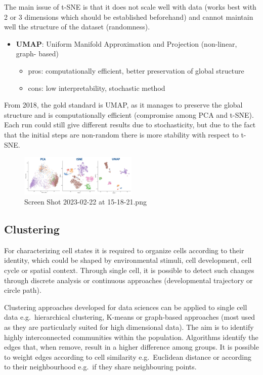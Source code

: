 The main issue of t-SNE is that it does not scale well with data (works
best with 2 or 3 dimensions which should be established beforehand) and
cannot maintain well the structure of the dataset (randomness).

\begin{itemize}
\tightlist
\item
  \textbf{UMAP}: Uniform Manifold Approximation and Projection
  (non-linear, graph- based)

  \begin{itemize}
  \tightlist
  \item
    pros: computationally efficient, better preservation of global
    structure
  \item
    cons: low interpretability, stochastic method
  \end{itemize}
\end{itemize}

From 2018, the gold standard is UMAP, as it manages to preserve the
global structure and is computationally efficient (compromise among PCA
and t-SNE). Each run could still give different results due to
stochasticity, but due to the fact that the initial steps are non-random
there is more stability with respect to t-SNE.

\begin{figure}
\centering
\includegraphics[width=0.5\textwidth]{images/Screen_Shot_2023-02-22_at_15-18-21.png}
\caption{Screen Shot 2023-02-22 at 15-18-21.png}
\end{figure}

\hypertarget{clustering}{%
\subsection{Clustering}\label{clustering}}

For characterizing cell states it is required to organize cells
according to their identity, which could be shaped by environmental
stimuli, cell development, cell cycle or spatial context. Through single
cell, it is possible to detect such changes through discrete analysis or
continuous approaches (developmental trajectory or circle path).

Clustering approaches developed for data sciences can be applied to
single cell data e.g.~hierarchical clustering, K-means or graph-based
approaches (most used as they are particularly suited for high
dimensional data). The aim is to identify highly interconnected
communities within the population. Algorithms identify the edges that,
when remove, result in a higher difference among groups. It is possible
to weight edges according to cell similarity e.g.~Euclidean distance or
according to their neighbourhood e.g.~if they share neighbouring points.

